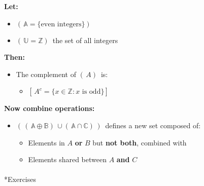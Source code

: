 \documentclass[
  letterpaper,
  DIV=11,
  numbers=noendperiod]{scrreprt}
\makeatletter
\let\oldparagraph\paragraph
\renewcommand{\paragraph}{
    \@ifstar
      \xxxParagraphStar
      \xxxParagraphNoStar
  }
\newcommand{\xxxParagraphStar}[1]{\oldparagraph*{#1}\mbox{}}
\newcommand{\xxxParagraphNoStar}[1]{\oldparagraph{#1}\mbox{}}
\providecommand{\tightlist}{%
  \setlength{\itemsep}{0pt}\setlength{\parskip}{0pt}}
\makeatother
\begin{document}
\textbf{Let:}

\begin{itemize}
\item
  \((\, \mathbb{A} = \{ \text{even integers} \} )\,\)
\item
  \((\, \mathbb{U} = \mathbb{Z} )\,\) the set of all integers
\end{itemize}

\textbf{Then:}

\begin{itemize}
\item
  The complement of \((\, A )\,\) is:

  \begin{itemize}
  \tightlist
  \item
    \([\,A^c = \{ x \in \mathbb{Z} : x \text{ is odd} \}]\,\)
  \end{itemize}
\end{itemize}

\textbf{Now combine operations:}

\begin{itemize}
\item
  \((\, (\, \mathbb{A} \oplus \mathbb{B})\, \cup (\, \mathbb{A} \cap \mathbb{C})\, )\,\)
  defines a new set composed of:

  \begin{itemize}
  \item
    Elements in \(A\) {\textbf{or}} \(B\) but {\textbf{not both}},
    combined with
  \item
    Elements shared between \(A\) {\textbf{and}} \(C\)
  \end{itemize}
\end{itemize}

\paragraph*{Exercises}\label{exercises}
\end{document}
